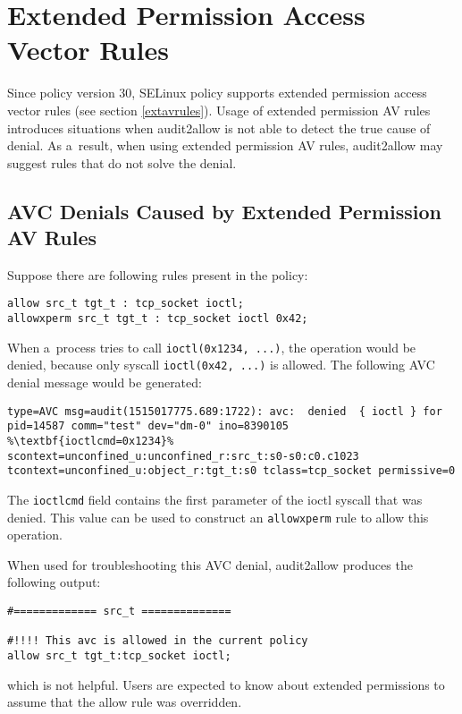 \section{Extended Permission Access Vector Rules}
Since policy version 30, SELinux policy supports extended permission access
vector rules (see section \ref{extavrules}). Usage of extended permission AV
rules introduces situations when audit2allow is not able to detect the true
cause of denial. As a~result, when using extended permission AV rules,
audit2allow may suggest rules that do not solve the denial.

\subsection{AVC Denials Caused by Extended Permission AV Rules}
Suppose there are following rules present in the policy:
\begin{lstlisting}
allow src_t tgt_t : tcp_socket ioctl;
allowxperm src_t tgt_t : tcp_socket ioctl 0x42;
\end{lstlisting}
When a~process tries to call \texttt{ioctl(0x1234, ...)}, the operation would be
denied, because only syscall \texttt{ioctl(0x42, ...)} is allowed. The following
AVC denial message would be generated:
\begin{lstlisting}[escapechar=\%]
type=AVC msg=audit(1515017775.689:1722): avc:  denied  { ioctl } for
pid=14587 comm="test" dev="dm-0" ino=8390105 %\textbf{ioctlcmd=0x1234}%
scontext=unconfined_u:unconfined_r:src_t:s0-s0:c0.c1023
tcontext=unconfined_u:object_r:tgt_t:s0 tclass=tcp_socket permissive=0
\end{lstlisting}
The \texttt{ioctlcmd} field contains the first parameter of the ioctl syscall
that was denied. This value can be used to construct an \texttt{allowxperm} rule
to allow this operation.

When used for troubleshooting this AVC denial, audit2allow produces the
following output:
\begin{lstlisting}
#============= src_t ==============

#!!!! This avc is allowed in the current policy
allow src_t tgt_t:tcp_socket ioctl;
\end{lstlisting}
which is not helpful. Users are expected to know about extended permissions to 
assume that the allow rule was overridden.

